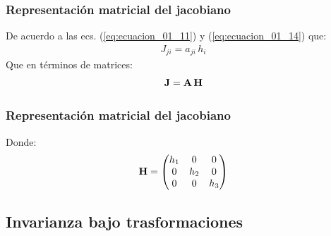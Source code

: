 \documentclass[12pt]{beamer}
\begin{document}
\begin{frame}
\frametitle{Representación matricial del jacobiano}
De acuerdo a las ecs. (\ref{eq:ecuacion_01_11}) y (\ref{eq:ecuacion_01_14}) que:
\pause
\begin{align*}
J_{ji} = a_{ji} \, h_{i}
\end{align*}
\pause
Que en términos de matrices:
\begin{align}
\vb{J} = \vb{A} \, \vb{H}
\label{eq:ecuacion_01_16}
\end{align}
\end{frame}
\begin{frame}
\frametitle{Representación matricial del jacobiano}
Donde:
\pause
\begin{align}
\vb{H} = \begin{pmatrix}
h_{1} & 0 & 0 \\
0 & h_{2} & 0 \\
0 & 0 & h_{3} \\
\end{pmatrix}
\label{eq:ecuacion_01_17}
\end{align}
\end{frame}

\subsection*{Invarianza bajo trasformaciones}
\end{document}

